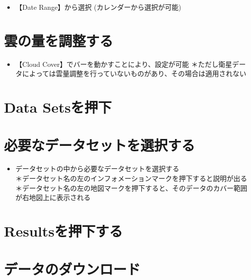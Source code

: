\documentclass[
]{book}
\providecommand{\tightlist}{%
  \setlength{\itemsep}{0pt}\setlength{\parskip}{0pt}}
\begin{document}
\begin{itemize}
\tightlist
\item
  【Date Range】から選択
  (カレンダーから選択が可能)
\end{itemize}

\hypertarget{ux96f2ux306eux91cfux3092ux8abfux6574ux3059ux308b}{%
\section{雲の量を調整する}\label{ux96f2ux306eux91cfux3092ux8abfux6574ux3059ux308b}}

\begin{itemize}
\tightlist
\item
  【Cloud Cover】でバーを動かすことにより、設定が可能
  ＊ただし衛星データによっては雲量調整を行っていないものがあり、その場合は適用されない
\end{itemize}

\hypertarget{data-setsux3092ux62bcux4e0b}{%
\section{Data Setsを押下}\label{data-setsux3092ux62bcux4e0b}}

\hypertarget{ux5fc5ux8981ux306aux30c7ux30fcux30bfux30bbux30c3ux30c8ux3092ux9078ux629eux3059ux308b}{%
\section{必要なデータセットを選択する}\label{ux5fc5ux8981ux306aux30c7ux30fcux30bfux30bbux30c3ux30c8ux3092ux9078ux629eux3059ux308b}}

\begin{itemize}
\tightlist
\item
  データセットの中から必要なデータセットを選択する\\
  ＊データセット名の左のインフォメーションマークを押下すると説明が出る\\
  ＊データセット名の左の地図マークを押下すると、そのデータのカバー範囲が右地図上に表示される
\end{itemize}

\hypertarget{resultsux3092ux62bcux4e0bux3059ux308b}{%
\section{Resultsを押下する}\label{resultsux3092ux62bcux4e0bux3059ux308b}}

\hypertarget{ux30c7ux30fcux30bfux306eux30c0ux30a6ux30f3ux30edux30fcux30c9}{%
\section{データのダウンロード}\label{ux30c7ux30fcux30bfux306eux30c0ux30a6ux30f3ux30edux30fcux30c9}}
\end{document}
